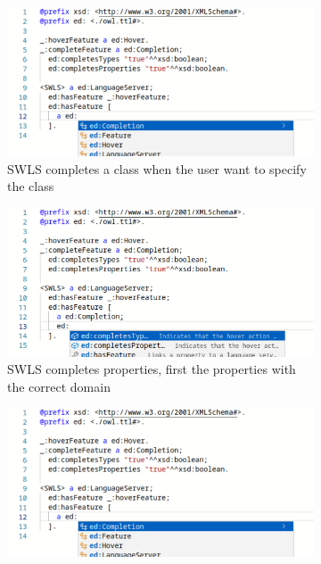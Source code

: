 \begin{figure}[h!tb]
    \centering
    \begin{subfigure}{0.48\textwidth}
      \includegraphics[width=\textwidth]{./images/class_complete.png}
      \caption{SWLS completes a class when the user want to specify the class}
      \label{class_completion}
    \end{subfigure}
    \hfill
    \begin{subfigure}{0.48\textwidth}
      \includegraphics[width=\textwidth]{./images/property_complete.png}
      \caption{SWLS completes properties, first the properties with the correct domain}
      \label{property_completion}
    \end{subfigure}
    \hfill
    \begin{subfigure}{0.48\textwidth}
      \includegraphics[width=\textwidth]{./images/class_complete.png}

\end{subfigure}
\end{figure}

